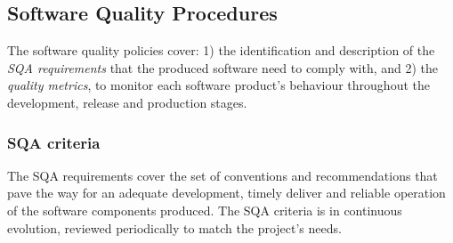 \documentclass[journal]{IEEEtran}
\begin{document}

\subsection{Software Quality Procedures}
\label{subsec:sqa}

The software quality policies \cite{indigo-d31} cover: 1) the identification
and description of the \emph{SQA requirements} that the produced software need 
to comply with, and 2) the \emph{quality metrics}, to monitor each software product's 
behaviour throughout the development, release and production stages.

\subsubsection{SQA criteria}

The SQA requirements cover the set of conventions and recommendations that pave the way for
an adequate development, timely deliver and reliable operation of the software components
produced. The SQA criteria is in continuous evolution, reviewed periodically to match the
project's needs.
\end{document}
